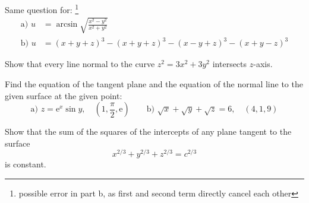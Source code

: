 \documentclass[11pt]{amsbook}
\begin{document}
\begin{exmp}
	Same question for: \footnote{possible error in part b, as first and second term directly cancel each other}
	\begin{align*}
		\text{a) } u &= \arcsin \sqrt{\frac{x^2 - y^2} {x^2 + y^2}} \\
		\text{b) } u &= (x + y + z)^3 - (x + y + z)^3 - (x - y + z)^3 - (x + y - z)^3 
	\end{align*}
\end{exmp}

\begin{exmp}
	Show that every line normal to the curve $z^2 = 3x^2 + 3y^2$ intersects $z$-axis.
\end{exmp}

\begin{exmp}
	Find the equation of the tangent plane and the equation of the normal line to the given surface at the given point:
	\begin{equation*}
		\text{a) } 
		z = \text{e}^x \sin y, \quad (1, \frac{\pi}{2}, \text{e}) 
		\qquad 
		\text{b) } 
		\sqrt{x} + \sqrt{y} + \sqrt{z} = 6, \quad (4, 1, 9)
	\end{equation*}
\end{exmp}

\begin{exmp}
	Show that the sum of the squares of the intercepts of any plane tangent to the surface
	\begin{equation*}
		x^{2/3} + y^{2/3} + z ^{2/3} = c^{2/3}
	\end{equation*}
	is constant.
\end{exmp}

\end{document}
